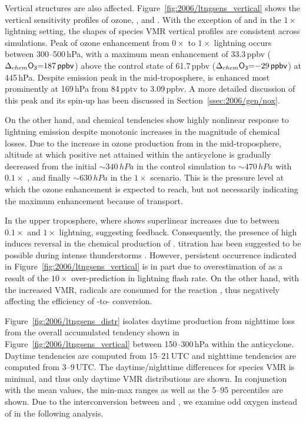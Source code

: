 Vertical structures are also affected. Figure~\ref{fig:2006/ltngsens_vertical} shows the vertical sensitivity profiles of ozone,
, and . With the exception of  and  in the $1\times$ lightning setting, the
shapes of species VMR vertical profiles are consistent across simulations. Peak of ozone enhancement from
$0\times$ to $1\times$ lightning occurs between 300--500\,\unit{hPa}, with a maximum mean  enhancement
of 33.3\,\unit{ppbv} ($\Delta_{chem}\chem{O_3}=187\,\unit{ppbv}$) above the control state of 61.7\,\unit{ppbv}
($\Delta_{chem}\chem{O_3}=-29\,\unit{ppbv}$) at 445\,\unit{hPa}. Despite emission peak in the mid-troposphere,
 is enhanced most prominently at 169\,\unit{hPa} from 84\,\unit{pptv} to 3.09\,\unit{ppbv}. A more detailed
discussion of this peak and its spin-up has been discussed in Section~\ref{ssec:2006/gen/nox}.

On the other hand,  and  chemical tendencies show highly nonlinear response to lightning emission
despite monotonic increases in the magnitude of  chemical losses. Due to the increase in ozone production
from {\lnox} in the mid-troposphere, altitude at which positive net  attained within the anticyclone is gradually
decreased from the initial $\sim340\,\unit{hPa} $ in the control simulation to $\sim470\,\unit{hPa}$ with $0.1\times$ {\lnox},
and finally $\sim630\,\unit{hPa}$ in the $1\times$ scenario. This is the pressure level at which the ozone enhancement
is expected to reach, but not necessarily indicating the maximum enhancement because of transport.

In the upper troposphere, where  shows superlinear increases due to {\lnox} between $0.1\times$
and $1\times$ lightning, suggesting feedback. Consequently, the presence of high  induces reversal in the chemical production
of .  titration has been suggested to be possible during intense thunderstorms \citep[e.g.][]{Cummings:2013vn}.
However, persistent occurrence indicated in Figure~\ref{fig:2006/ltngsens_vertical} is in part due to overestimation of
 as a result of the $10\times$ over-prediction in lightning flash rate. On the other hand, with the increased
 VMR,  radicals are consumed for the reaction ,
thus negatively affecting the efficiency of -to- conversion.

Figure~\ref{fig:2006/ltngsens_distr} isolates daytime production from nighttime loss from the overall accumulated tendency shown
in Figure~\ref{fig:2006/ltngsens_vertical} between 150--300\,\unit{hPa} within the anticyclone. Daytime tendencies are computed
from 15--21\,\unit{UTC} and nighttime tendencies are computed from 3--9\,\unit{UTC}. The daytime/nighttime differences for species
VMR is minimal, and thus only daytime VMR distributions are shown. In conjunction with the mean values, the min-max ranges as well as the
5--95 percentiles are shown. Due to the interconversion between  and , we examine odd oxygen
 instead of  in the following analysis.

